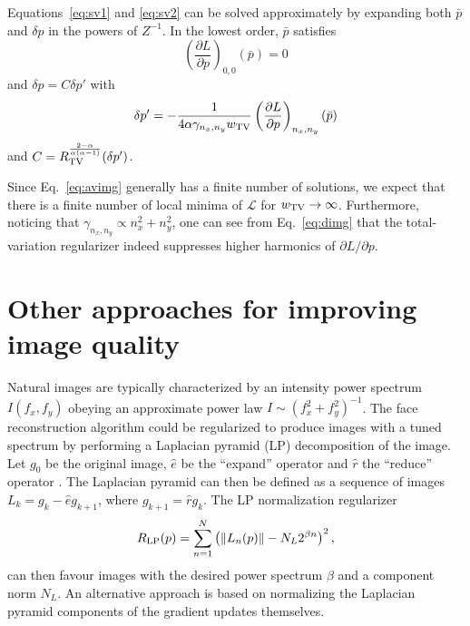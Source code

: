 \documentclass{article}
\def\Img{p}
\def\Reg{R}
\def\RegLP{\Reg_{\rm LP}}
\def\wtv{w_{\rm TV}}
\newcommand{\op}[1]{\hat{#1}}
\def\LPComponent{L}
\def\LPNorm{N_L}
\newcommand*\Laplace{\mathop{}\!\mathbin\bigtriangleup}
\newcommand{\mc}[1]{\mathcal{#1}}
\newcommand{\Eq}[1]{Eq.~\eqref{#1}}
\newcommand{\pd}[2]{\frac{\partial #1}{\partial #2}}
\newcommand{\pld}[2]{{{\partial} #1}/{{\partial} #2}}
\begin{document}
{    Equations~\eqref{eq:sv1} and \eqref{eq:sv2} can be solved approximately by expanding both $\bar{\Img}$ and $\delta \Img$ in the powers of $Z^{-1}$.
    In the lowest order, $\bar{\Img}$ satisfies
    \begin{equation}
      \label{eq:avimg}
      \left(\pd{L}{\Img}\right)_{0,0}(\bar{\Img}) = 0
    \end{equation}
    and $\delta \Img = C\delta \Img'$ with
    \begin{equation}
      \label{eq:dimg}
      \delta \Img' = -\frac{1}{4 \alpha \gamma_{n_x,n_y} \wtv} \left(\pd{L}{\Img}\right)_{n_x,n_y} (\bar{\Img})
    \end{equation}
    and $C = R_{\rm TV}^{\frac{2-\alpha}{\alpha(\alpha-1)}}(\delta p')$.

    Since \Eq{eq:avimg} generally has a finite number of solutions, we expect that there is a finite number of local minima of $\mc{L}$ for $\wtv\to \infty$.
    Furthermore, noticing that $\gamma_{n_x,n_y} \propto n_x^2 + n_y^2$, one can see from \Eq{eq:dimg} that the total-variation regularizer indeed suppresses higher harmonics of $\pld{L}{\Img}$.


  \section{Other approaches for improving image quality}
  \label{sec:regrest}

    Natural images are typically characterized by an intensity power spectrum $I(f_x,f_y)$ obeying \cite{schaaf:96} an approximate power law $I\sim (f_x^2+f_y^2)^{-1}$.
    The face reconstruction algorithm could be regularized to produce images with a tuned spectrum by performing a Laplacian pyramid (LP) decomposition \cite{burt:83} of the image.
    Let $g_0$ be the original image, $\op{e}$ be the ``expand'' operator and $\op{r}$ the ``reduce'' operator \cite{burt:83}.
    The Laplacian pyramid can then be defined as a sequence of images $L_k = g_k - \op{e} g_{k+1}$, where $g_{k+1} = \op{r} g_k$.
    The LP normalization regularizer
    \begin{equation}
      \label{eq:rlp}
      \RegLP(\Img) = \sum_{n=1}^{N} \left( \| \LPComponent_n(p) \| - \LPNorm 2^{\beta n}\right)^2,
    \end{equation}
    can then favour images with the desired power spectrum $\beta$ and a component norm $\LPNorm$.
    An alternative approach is based on normalizing the Laplacian pyramid components of the gradient updates themselves.

}
\end{document}
